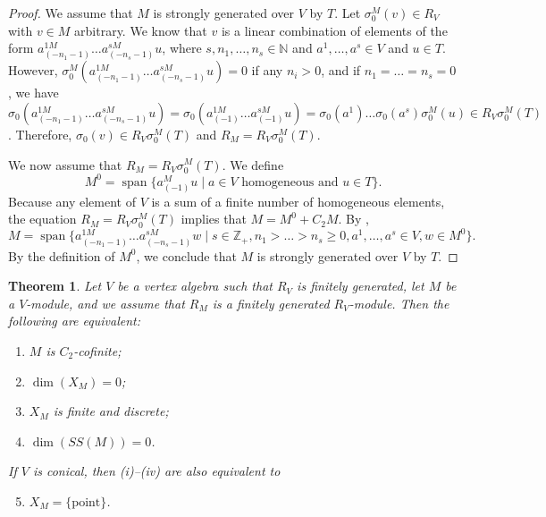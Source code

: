 \documentclass[a4paper, 12pt, reqno]{amsart}
\newtheorem{theorem}{Theorem}[section]
\theoremstyle{remark}
\DeclareMathOperator{\vspan}{span}
\begin{document}
\begin{proof}
  We assume that $M$ is strongly generated over $V$ by $T$.
  Let $\sigma^M_0(v) \in R_V$ with $v \in M$ arbitrary.
  We know that $v$ is a linear combination of elements of the form $a^{1M}_{(-n_1 - 1)}\dots a^{sM}_{(-n_s - 1)}u$, where $s, n_1, \dots, n_s \in \mathbb{N}$ and $a^1, \dots, a^s \in V$ and $u \in T$.
  However, $\sigma^M_0(a^{1M}_{(-n_1 - 1)}\dots a^{sM}_{(-n_s - 1)}u) = 0$ if any $n_i > 0$, and if $n_1 = \dots = n_s = 0$, we have $\sigma_0(a^{1M}_{(-n_1 - 1)}\dots a^{sM}_{(-n_s - 1)}u) = \sigma_0(a^{1M}_{(-1)}\dots a^{sM}_{(-1)}u) = \sigma_0(a^1)\dots\sigma_0(a^s)\sigma^M_0(u) \in R_V\sigma^M_0(T)$.
  Therefore, $\sigma_0(v) \in R_V\sigma^M_0(T)$ and $R_M = R_V\sigma^M_0(T)$.

  We now assume that $R_M = R_V\sigma^M_0(T)$.
  We define
  \begin{equation*}
    M^0 = \vspan\{a^M_{(-1)}u \mid \text{$a \in V$ homogeneous and $u \in T$}\}.
  \end{equation*}
  Because any element of $V$ is a sum of a finite number of homogeneous elements, the equation $R_M = R_V\sigma^M_0(T)$ implies that $M = M^0 + C_2M$.
  By \cite[Proposition 4.12]{li_abelianizing_2005},
  \begin{equation*}
    M = \vspan\{a^{1M}_{(-n_1 - 1)}\dots a^{sM}_{(-n_s - 1)}w \mid s \in \mathbb{Z}_+, n_1 > \dots > n_s \ge 0, a^1, \dots, a^s \in V, w \in M^0\}.
  \end{equation*}
  By the definition of $M^0$, we conclude that $M$ is strongly generated over $V$ by $T$.
\end{proof}

\begin{theorem}
  \label{thr:57}
  Let $V$ be a vertex algebra such that $R_V$ is finitely generated, let $M$ be a $V$-module, and we assume that $R_M$ is a finitely generated $R_V$-module.
  Then the following are equivalent:
  \begin{enumerate}
  \item $M$ is $C_2$-cofinite;
  \item $\dim(X_M) = 0$;
  \item $X_M$ is finite and discrete;
  \item $\dim(SS(M)) = 0$.
  \end{enumerate}
  If $V$ is conical, then \emph{(i)--(iv)} are also equivalent to
  \begin{enumerate}
    \setcounter{enumi}{4}
  \item $X_M = \{\mathrm{point}\}$.
  \end{enumerate}
\end{theorem}
\end{document}
